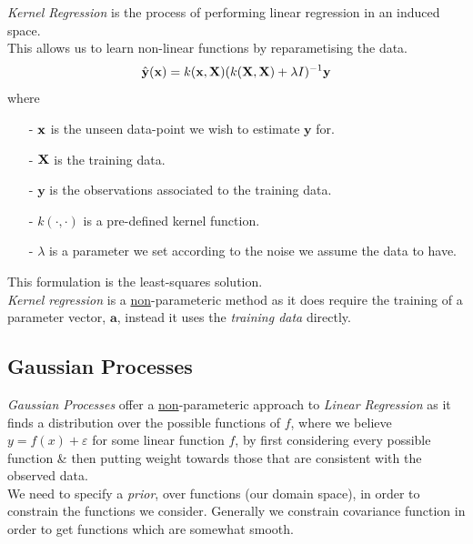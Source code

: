 \documentclass[11pt,a4paper]{article}
\begin{document}
\textit{Kernel Regression} is the process of performing linear regression in an induced space.\\
This allows us to learn non-linear functions by reparametising the data.\\
$$\hat{\textbf{y}}(\textbf{x})=k(\textbf{x},\textbf{X})(k(\textbf{X},\textbf{X})+\lambda I)^{-1}\textbf{y}$$
where
\begin{itemize}
	\item[-] $\textbf{x}$ is the unseen data-point we wish to estimate $\textbf{y}$ for.
	\item[-] $\textbf{X}$ is the training data.
	\item[-] $\textbf{y}$ is the observations associated to the training data.
	\item[-] $k(\cdot,\cdot)$ is a pre-defined kernel function.
	\item[-] $\lambda$ is a parameter we set according to the noise we assume the data to have.
\end{itemize}
\nb This formulation is the least-squares solution.\\

\textit{Kernel regression} is a \underline{non}-parameteric method as it does require the training of a parameter vector, $\textbf{a}$, instead it uses the \textit{training data} directly.

\subsection{Gaussian Processes}

\textit{Gaussian Processes} offer a \underline{non}-parameteric approach to \textit{Linear Regression} as it finds a distribution over the possible functions of $f$, where we believe $y=f(x)+\varepsilon$ for some linear function $f$, by first considering every possible function \& then putting weight towards those that are consistent with the observed data.\\

We need to specify a \textit{prior}, over functions (our domain space), in order to constrain the functions we consider. Generally we constrain covariance function in order to get functions which are somewhat smooth.\\

\end{document}
